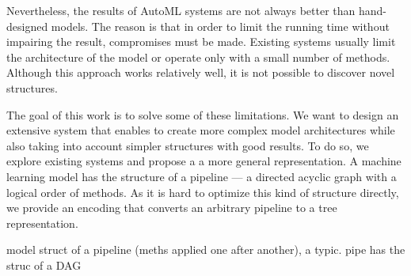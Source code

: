 Nevertheless, the results of AutoML systems are not always better
than hand-designed models. The reason is that in order to limit the running time
without impairing the result, compromises must be made. Existing systems
usually limit the architecture of the model or operate only with a small number
of methods. Although this approach works relatively well, it is not possible to
discover novel structures.

The goal of this work is to solve some of these limitations. We want to design
an extensive system that enables to create more complex model architectures
while also taking into account simpler structures with good results.
To do so, we explore existing systems and propose a a more general
representation. A machine learning model has the structure of a pipeline ---
a directed acyclic graph with a logical order of methods. As it is hard to
optimize this kind of structure directly, we provide an encoding that converts
an arbitrary pipeline to a tree representation.

model struct of a pipeline (meths applied one after another), 
a typic. pipe has the struc of a DAG